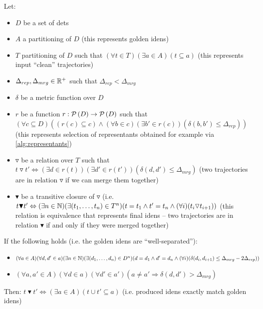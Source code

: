 \begin{claim}
\label{clm:claim}
Let:

\setlength{\itemsep}{0pt}
\setlength{\parskip}{0pt}

\begin{itemize}
    \item $D$ be a set of \glspl{det}
    \item $A$ a partitioning of $D$ (this represents golden \glspl{iden})
    \item $T$ partitioning of $D$ such that $(\forall t \in T) (\exists a \in A) (t \subseteq a)$ (this represents input ``clean'' trajectories)
    \item $\Delta_{rep}, \Delta_{mrg} \in \mathbb{R}^+$ such that $\Delta_{rep} < \Delta_{mrg}$
    \item $\delta$ be a metric function over $D$
    \item $r$ be a function $r: \mathcal{P}\left(D\right) \rightarrow \mathcal{P}\left(D\right)$ such that $(\forall c \subseteq D)((r(c) \subseteq c) \land (\forall b \in c) (\exists b' \in r(c)) (\delta(b, b') \leq \Delta_{rep}))$ (this represents selection of representants obtained for example via \autoref{alg:representants})
    \item $\triangledown$ be a relation over $T$ such that $t\triangledown t' \Leftrightarrow (\exists d \in r(t)) (\exists d' \in r(t')) (\delta(d, d') \leq \Delta_{mrg})$ (two trajectories are in relation $\triangledown$ if we can merge them together)
    \item $\blacktriangledown$ be a transitive closure of $\triangledown$ (i.e. $t \blacktriangledown t' \Leftrightarrow (\exists n \in \mathbb{N}) (\exists (t_1, \ldots, t_n) \in T^n) (t = t_1 \land t' = t_n \land (\forall i) (t_i\triangledown t_{i+1}))$ (this relation is equivalence that represents final \glspl{iden} -- two trajectories are in relation $\blacktriangledown$ if and only if they were merged together)
\end{itemize}

If the following holds (i.e. the golden \glspl{iden} are ``well-separated''):
\begin{itemize}
    \item $(\forall a \in A)(\forall d, d' \in a) (\exists n \in \mathbb{N}) (\exists (d_1, \ldots, d_n) \in D^n) (d = d_1 \land d' = d_n \land (\forall i) (\delta(d_i, d_{i+1}) \leq \Delta_{mrg} - 2\Delta_{rep}))$
    \item $(\forall a, a' \in A) (\forall d \in a) (\forall d' \in a') (a \neq a' \Rightarrow \delta(d, d') > \Delta_{mrg})$
\end{itemize}

Then: $t\blacktriangledown t' \Leftrightarrow (\exists a \in A) (t \cup t' \subseteq a)$ (i.e. produced \glspl{iden} exactly match golden \glspl{iden})

\end{claim}

